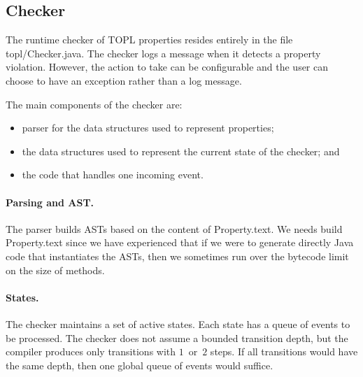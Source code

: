 \documentclass{sigplanconf}[10pt] %
\begin{document}
\subsection{Checker} %

The runtime checker of TOPL properties resides entirely in the file
{\sf topl/Checker.java}. 
The checker logs a message when it detects a property violation. However, 
the action to take can be configurable and the user can choose to have an exception rather than a log message.

The main components of the checker are: 
\begin{itemize}
\item parser for the data structures used to represent properties;
\item the data structures used to represent the current state of the checker; and 
\item the code that handles one incoming event.
\end{itemize}

\paragraph{Parsing and AST\null.}
The parser builds ASTs based on the content of \textsf{Property.text}.
We needs build \textsf{Property.text} since we have experienced that if we were to 
 generate directly Java code that instantiates the ASTs, 
 then we sometimes run over the bytecode limit on the size of methods.


\paragraph{States.}
The checker maintains a set of active states.
Each state has a queue of events to be processed.
The checker does not assume a bounded transition depth, but the compiler produces only transitions with $1$~or~$2$ steps.
If all transitions would have the same depth, then one global queue of events would suffice.
\end{document}
